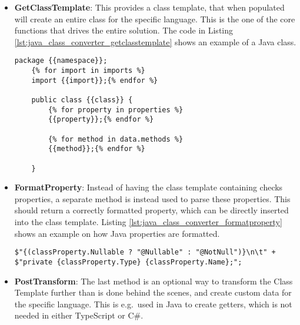 \begin{itemize}
    \item \textbf{GetClassTemplate}: This provides a class template, that when populated will create an entire class for the specific language.
    This is the one of the core functions that drives the entire solution.
    The code in Listing \ref{lst:java_class_converter_getclasstemplate} shows an example of a Java class.
    \begin{lstlisting}[caption={Implementation of a Java class template}, label={lst:java_class_converter_getclasstemplate}, style=base_csharp]
    package {{namespace}};
    {% for import in imports %}
    import {{import}};{% endfor %}
    
    public class {{class}} {
        {% for property in properties %}
        {{property}};{% endfor %}
    
        {% for method in data.methods %}
        {{method}};{% endfor %}
    
    }
    \end{lstlisting}

    \item \textbf{FormatProperty}: Instead of having the class template containing checks properties, a separate method is instead used to parse these properties.
    This should return a correctly formatted property, which can be directly inserted into the class template.
    Listing \ref{lst:java_class_converter_formatproperty} shows an example on how Java properties are formatted.
    \begin{lstlisting}[caption={How a Java property is defined}, label={lst:java_class_converter_formatproperty}, style=base]
$"{(classProperty.Nullable ? "@Nullable" : "@NotNull")}\n\t" +
$"private {classProperty.Type} {classProperty.Name};";
    \end{lstlisting}
    \noindent

    \item \textbf{PostTransform}: The last method is an optional way to transform the Class Template further than is done behind the scenes, and create custom data for the specific language.
    This is e.g.\ used in Java to create getters, which is not needed in either TypeScript or C\#.
\end{itemize}

